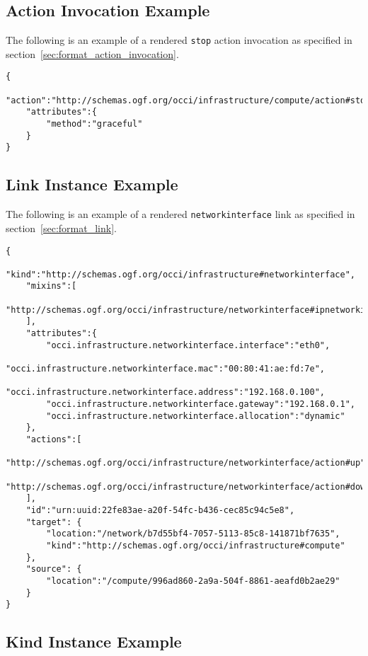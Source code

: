 \documentclass[10pt,a4paper]{article}
\begin{document}
\begin{appendices}
\subsection{Action Invocation Example}
\label{action_invocation_rendering_example}

The following is an example of a rendered \texttt{stop} action invocation as specified in section~\ref{sec:format_action_invocation}.

\begin{lstlisting}
{
    "action":"http://schemas.ogf.org/occi/infrastructure/compute/action#stop",
    "attributes":{
        "method":"graceful"
    }
}
\end{lstlisting}

\subsection{Link Instance Example}
\label{link_instance_rendering_example}

The following is an example of a rendered \texttt{networkinterface} link as specified in section~\ref{sec:format_link}.


\begin{lstlisting}
{
    "kind":"http://schemas.ogf.org/occi/infrastructure#networkinterface",
    "mixins":[
        "http://schemas.ogf.org/occi/infrastructure/networkinterface#ipnetworkinterface"
    ],
    "attributes":{
        "occi.infrastructure.networkinterface.interface":"eth0",
        "occi.infrastructure.networkinterface.mac":"00:80:41:ae:fd:7e",
        "occi.infrastructure.networkinterface.address":"192.168.0.100",
        "occi.infrastructure.networkinterface.gateway":"192.168.0.1",
        "occi.infrastructure.networkinterface.allocation":"dynamic"
    },
    "actions":[
        "http://schemas.ogf.org/occi/infrastructure/networkinterface/action#up",
        "http://schemas.ogf.org/occi/infrastructure/networkinterface/action#down"
    ],
    "id":"urn:uuid:22fe83ae-a20f-54fc-b436-cec85c94c5e8",
    "target": {
        "location:"/network/b7d55bf4-7057-5113-85c8-141871bf7635",
        "kind":"http://schemas.ogf.org/occi/infrastructure#compute"
    },
    "source": {
        "location":"/compute/996ad860-2a9a-504f-8861-aeafd0b2ae29"
    }
}
\end{lstlisting}

\subsection{Kind Instance Example}
\label{kind_instance_rendering_example}


\end{appendices}
\end{document}
